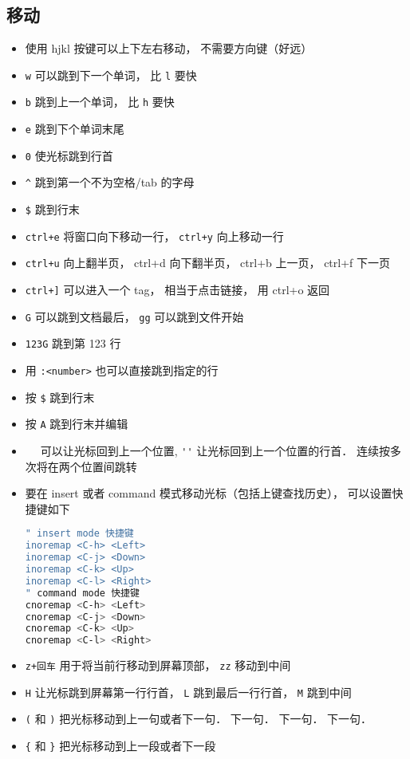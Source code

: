 \subsection{移动}
\begin{itemize}
\item 使用 hjkl 按键可以上下左右移动， 不需要方向键（好远）
\item \verb`w` 可以跳到下一个单词， 比 \verb`l` 要快
\item \verb`b` 跳到上一个单词， 比 \verb`h` 要快
\item \verb`e` 跳到下个单词末尾
\item \verb`0` 使光标跳到行首
\item \verb`^` 跳到第一个不为空格/tab 的字母
\item \verb`$` 跳到行末
\item \verb`ctrl+e` 将窗口向下移动一行， \verb`ctrl+y` 向上移动一行
\item \verb`ctrl+u` 向上翻半页， ctrl+d 向下翻半页， ctrl+b 上一页， ctrl+f 下一页
\item \verb`ctrl+]` 可以进入一个 tag， 相当于点击链接， 用 ctrl+o 返回
\item \verb`G` 可以跳到文档最后， \verb`gg` 可以跳到文件开始
\item \verb`123G` 跳到第 123 行
\item 用 \verb`:<number>` 也可以直接跳到指定的行
\item 按 \verb`$` 跳到行末
\item 按 \verb`A` 跳到行末并编辑
\item \verb` `\verb` ` 可以让光标回到上一个位置, \verb`''` 让光标回到上一个位置的行首． 连续按多次将在两个位置间跳转
\item 要在 insert 或者 command 模式移动光标（包括上键查找历史）， 可以设置快捷键如下
\begin{lstlisting}[language=bash]
" insert mode 快捷键
inoremap <C-h> <Left>
inoremap <C-j> <Down>
inoremap <C-k> <Up>
inoremap <C-l> <Right>
" command mode 快捷键
cnoremap <C-h> <Left>
cnoremap <C-j> <Down>
cnoremap <C-k> <Up>
cnoremap <C-l> <Right>
\end{lstlisting}
\item \verb`z+回车` 用于将当前行移动到屏幕顶部， \verb`zz` 移动到中间
\item \verb`H` 让光标跳到屏幕第一行行首， \verb`L` 跳到最后一行行首， \verb`M` 跳到中间
\item \verb`(` 和 \verb`)` 把光标移动到上一句或者下一句． 下一句． 下一句． 下一句．
\item \verb`{` 和 \verb`}` 把光标移动到上一段或者下一段
\end{itemize}

